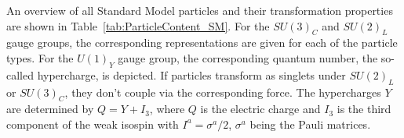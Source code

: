 An overview of all Standard Model particles and their transformation properties are shown in Table~\ref{tab:ParticleContent_SM}.
For the $SU(3)_C$ and $SU(2)_L$ gauge groups, the corresponding representations are given for each of the particle types.
For the $U(1)_Y$ gauge group, the corresponding quantum number, the so-called hypercharge, is depicted.
If particles transform as singlets under $SU(2)_L$ or $SU(3)_C$, they don't couple via the corresponding force.
The hypercharges $Y$ are determined by $Q=Y+I_3$, where $Q$ is the electric charge and $I_3$ is the third component of the weak isospin with $I^a = \sigma^a/2$, $\sigma^a$ being the Pauli matrices. 

\renewcommand{\arraystretch}{1.4}
\begin{table}[!h]
\centering
\caption{All particles contained in the Standard Model and their transformation properties under $SU(3)_C  \times SU(2)_L \times U(1)_Y$. 
         For the gauge groups $SU(3)_C$ and $SU(2)_L$, the representations are listed whereas for $U(1)_Y$ the hypercharge is given.}
\label{tab:ParticleContent_SM}
\end{table}  


